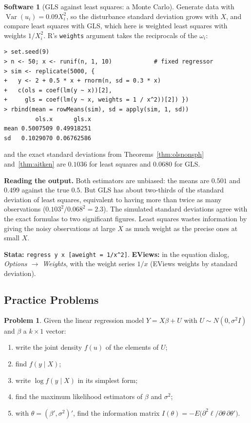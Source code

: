 \documentclass[11pt,a4paper]{article}
\numberwithin{equation}{section}
\DeclareMathOperator{\Var}{Var}
\theoremstyle{definition}
\newtheorem{software}[thm]{Software}
\newtheorem{problemx}{Problem}[subsection]
\newenvironment{problem}{\begin{problemx}}{\end{problemx}}
\begin{document}
\begin{software}[GLS against least squares: a Monte Carlo]
\label{sw:glsmc}
Generate data with $\Var(u_i) = 0.09X_i^2$, so the disturbance standard deviation grows with $X$, and compare least squares with GLS, which here is
weighted least squares with weights $1/X_i^2$. R's \texttt{weights} argument takes the reciprocals of the $\omega_i$:
{\small\begin{verbatim}
> set.seed(9)
> n <- 50; x <- runif(n, 1, 10)            # fixed regressor
> sim <- replicate(5000, {
+   y <- 2 + 0.5 * x + rnorm(n, sd = 0.3 * x)
+   c(ols = coef(lm(y ~ x))[2],
+     gls = coef(lm(y ~ x, weights = 1 / x^2))[2]) })
> rbind(mean = rowMeans(sim), sd = apply(sim, 1, sd))
         ols.x      gls.x
mean 0.5007509 0.49918251
sd   0.1029070 0.06762586
\end{verbatim}}
and the exact standard deviations from Theorems~\ref{thm:olsnonsph} and~\ref{thm:aitken} are $0.1036$ for least squares and $0.0680$ for GLS.

\textbf{Reading the output.} Both estimators are unbiased: the means are $0.501$ and $0.499$ against the true $0.5$. But GLS has about two-thirds of the
standard deviation of least squares, equivalent to having more than twice as many observations ($0.103^2/0.068^2 = 2.3$). The simulated standard deviations
agree with the exact formulas to two significant figures. Least squares wastes information by giving the noisy observations at large $X$ as much
weight as the precise ones at small $X$.

\textbf{Stata:} \texttt{regress y x [aweight = 1/x\textasciicircum2]}. \textbf{EViews:} in the equation dialog, \emph{Options $\to$ Weights}, with the
weight series $1/x$ (EViews weights by standard deviation).
\end{software}

\subsection{Practice Problems}

\begin{problem}
Given the linear regression model $Y = X\beta + U$ with $U \sim N(0, \sigma^2I)$ and $\beta$ a $k \times 1$ vector:
\begin{enumerate}[label=(\roman*)]
\item write the joint density $f(u)$ of the elements of $U$;
\item find $f(y \mid X)$;
\item write $\log f(y \mid X)$ in its simplest form;
\item find the maximum likelihood estimators of $\beta$ and $\sigma^2$;
\item with $\theta = (\beta', \sigma^2)'$, find the information matrix $I(\theta) = -E\bigl(\partial^2\ell/\partial\theta\,\partial\theta'\bigr)$.
\end{enumerate}
\end{problem}
\end{document}
